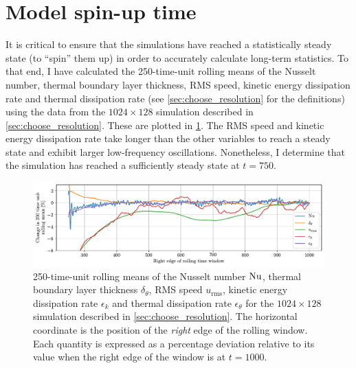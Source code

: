 \documentclass[../main.tex]{subfiles}
\begin{document}
\section{Model spin-up time} \label{sec:spinup}
It is critical to ensure that the simulations have reached a statistically
steady state (to ``spin'' them up) in order to accurately calculate long-term
statistics. To that end, I have calculated the 250-time-unit rolling means of
the Nusselt number, thermal boundary layer thickness, RMS speed, kinetic energy
dissipation rate and thermal dissipation rate (see
\cref{sec:choose_resolution} for the definitions) using the data from the
$1024 \times 128$ simulation described in \cref{sec:choose_resolution}.
These are plotted in \cref{fig:1024x128_spin_up}. The RMS speed and kinetic
energy dissipation rate take longer than the other variables to reach a steady
state and exhibit larger low-frequency oscillations. Nonetheless, I determine
that the simulation has reached a sufficiently steady state at $t = 750$.

\begin{figure}[ht]
    \centering
    \includegraphics[width=\linewidth]{figures/1024x128_spin_up.pdf}
    \caption{
        250-time-unit rolling means of the Nusselt number $\mathrm{Nu}$, thermal
        boundary layer thickness $\delta_\theta$, RMS speed $u_\mathrm{rms}$,
        kinetic energy dissipation rate $\epsilon_k$ and thermal dissipation
        rate $\epsilon_\theta$ for the $1024 \times 128$ simulation described
        in \cref{sec:choose_resolution}. The horizontal coordinate is the
        position of the \emph{right} edge of the rolling window. Each quantity
        is expressed as a percentage deviation relative to its value when
        the right edge of the window is at $t=1000$.
    }
    \label{fig:1024x128_spin_up}
\end{figure}
\end{document}
